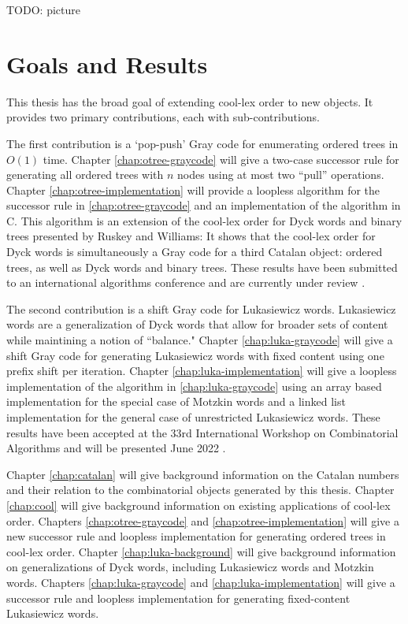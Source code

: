 TODO: picture



\section{Goals and Results}


This thesis has the broad goal of extending cool-lex order to new objects.  It provides two primary contributions, each with sub-contributions.  

The first contribution is a `pop-push' Gray code for enumerating ordered trees in $O(1)$ time. Chapter \ref{chap:otree-graycode} will give a two-case successor rule for generating all ordered trees with $n$ nodes using at most two ``pull'' operations. Chapter \ref{chap:otree-implementation} will provide a loopless algorithm for the successor rule in \ref{chap:otree-graycode} and an implementation of the algorithm in C.  This algorithm is an extension of the cool-lex order for Dyck words and binary trees presented by Ruskey and Williams: It shows that the cool-lex order for Dyck words is simultaneously a Gray code for a third Catalan object: ordered trees, as well as Dyck words and binary trees.  These results have been submitted to an international algorithms conference and are currently under review \cite{lapeypush}.

The second contribution is a shift Gray code for Lukasiewicz words.  Lukasiewicz words are a generalization of Dyck words that allow for broader sets of content while maintining a notion of ``balance." Chapter \ref{chap:luka-graycode} will give a shift Gray code for generating Lukasiewicz words with fixed content using one prefix shift per iteration.  Chapter \ref{chap:luka-implementation} will give a loopless implementation of the algorithm in \ref{chap:luka-graycode} using an array based implementation for the special case of Motzkin words and a linked list implementation for the general case of unrestricted Lukasiewicz words.  These results have been accepted at the 33rd International Workshop on Combinatorial Algorithms and will be presented June 2022 \cite{lapey2022shift}.

Chapter \ref{chap:catalan} will give background information on the Catalan numbers and their relation to the combinatorial objects generated by this thesis.  Chapter \ref{chap:cool} will give background information on existing applications of cool-lex order.  Chapters \ref{chap:otree-graycode} and \ref{chap:otree-implementation} will give a new successor rule and loopless implementation for generating ordered trees in cool-lex order.  Chapter \ref{chap:luka-background} will give background information on generalizations of Dyck words, including Lukasiewicz words and Motzkin words. Chapters \ref{chap:luka-graycode} and \ref{chap:luka-implementation} will give a successor rule and loopless implementation for generating fixed-content Lukasiewicz words.
